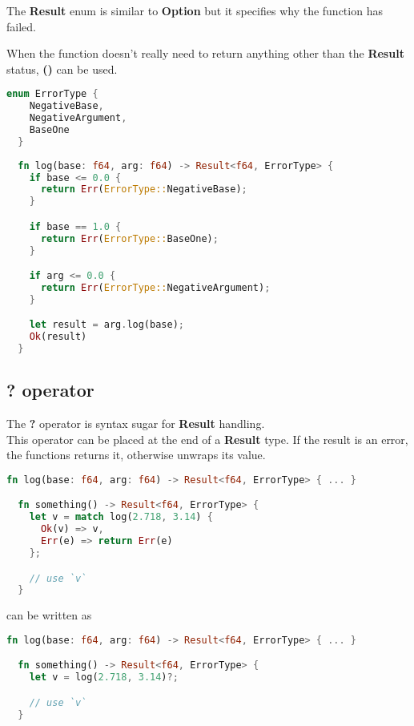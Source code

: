 \documentclass{article}
\begin{document}
The \textbf{Result} enum is similar to \textbf{Option} but it
specifies why the function has failed.

When the function doesn't really need to return anything other than the
\textbf{Result} status, \textbf{()} can be used.

\begin{lstlisting}[language=Rust, style=boxed, numbers=none]
  enum ErrorType {
    NegativeBase,
    NegativeArgument,
    BaseOne
  }
  
  fn log(base: f64, arg: f64) -> Result<f64, ErrorType> {
    if base <= 0.0 {
      return Err(ErrorType::NegativeBase);
    }

    if base == 1.0 {
      return Err(ErrorType::BaseOne);
    }

    if arg <= 0.0 {
      return Err(ErrorType::NegativeArgument);
    }

    let result = arg.log(base);
    Ok(result)
  }
\end{lstlisting}

\pagebreak

\subsection{? operator}

The \textbf{?} operator is syntax sugar for \textbf{Result} handling. \\
This operator can be placed at the end of a \textbf{Result} type.
If the result is an error, the functions returns it, otherwise unwraps
its value.

\begin{lstlisting}[language=Rust, style=boxed, numbers=none]
  fn log(base: f64, arg: f64) -> Result<f64, ErrorType> { ... }

  fn something() -> Result<f64, ErrorType> {
    let v = match log(2.718, 3.14) {
      Ok(v) => v,
      Err(e) => return Err(e)
    };

    // use `v`
  }
\end{lstlisting}

can be written as

\begin{lstlisting}[language=Rust, style=boxed, numbers=none]
  fn log(base: f64, arg: f64) -> Result<f64, ErrorType> { ... }

  fn something() -> Result<f64, ErrorType> {
    let v = log(2.718, 3.14)?;

    // use `v`
  }
\end{lstlisting}
\end{document}
